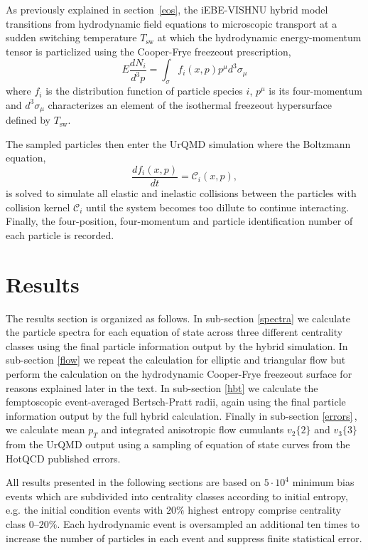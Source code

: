 \documentclass[aps,prc,reprint,amsmath,nofootinbib,superscriptaddress]{revtex4-1}
\begin{document}
As previously explained in section \,\ref{eos}, the iEBE-VISHNU hybrid model transitions from hydrodynamic field equations to microscopic transport at a sudden switching temperature $T_\text{sw}$ 
at which the hydrodynamic energy-momentum tensor is particlized using the Cooper-Frye freezeout prescription,
\begin{equation}
 E\frac{dN_i}{d^3p} = \int_\sigma f_i(x,p) p^\mu d^3\sigma_\mu
 \label{cooper-frye}
\end{equation}
where $f_i$ is the distribution function of particle species $i$, $p^\mu$ is its four-momentum and $d^3\sigma_\mu$ characterizes an element of the isothermal freezeout 
hypersurface defined by $T_\text{sw}$.

The sampled particles then enter the UrQMD simulation where the Boltzmann equation, 
\begin{equation}
 \frac{df_i(x,p)}{dt} = \mathcal{C}_i(x,p),
\end{equation}
is solved to simulate all elastic and inelastic collisions between the particles with collision kernel $\mathcal{C}_i$ until the system becomes too dillute to continue interacting. 
Finally, the four-position, four-momentum and particle identification number of each particle is recorded. 

\section{Results}
\label{results}

The results section is organized as follows. In sub-section \ref{spectra} we calculate the particle spectra for each equation of state across three different centrality classes using the final 
particle information output by the hybrid simulation. In sub-section \ref{flow} we repeat the calculation for elliptic and triangular flow but perform the calculation on the 
hydrodynamic Cooper-Frye freezeout surface for reasons explained later in the text. In sub-section \ref{hbt} we calculate the femptoscopic event-averaged Bertsch-Pratt radii, again using the 
final particle information output by the full hybrid calculation. Finally in sub-section \ref{errors}\,, we calculate mean $p_T$ and integrated anisotropic flow cumulants $v_2\{2\}$ and $v_3\{3\}$ from the UrQMD output using a sampling of equation of state curves from the HotQCD published errors. 

All results presented in the following sections are based on $5\cdot10^4$ minimum bias events which are subdivided into centrality classes according to initial entropy, e.g. the initial condition events with $20\%$ highest entropy comprise centrality class $0$--$20\%$. Each hydrodynamic event is oversampled an additional ten times to increase the number of particles in each event and suppress finite statistical error.
\end{document}
